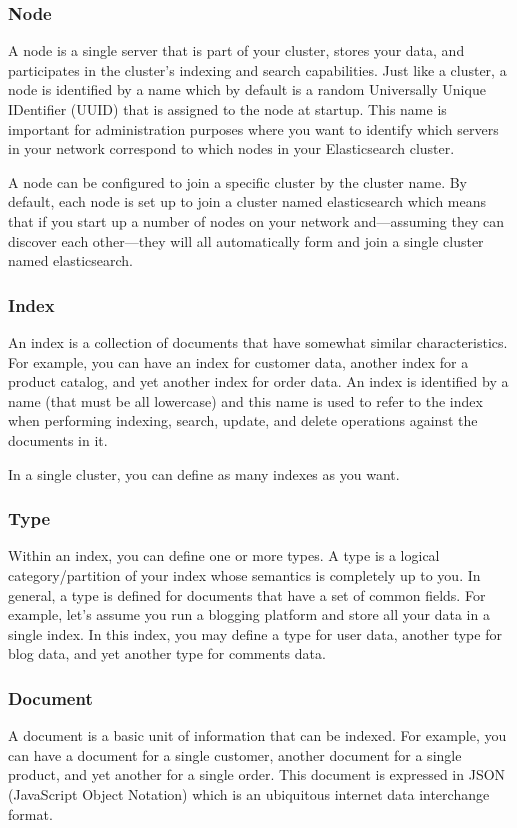 \documentclass[a4paper, 12pt]{book}
\begin{document}
\subsubsection{Node}
A node is a single server that is part of your cluster, stores your data, and participates in the cluster’s indexing and search capabilities. Just like a cluster, a node is identified by a name which by default is a random Universally Unique IDentifier (UUID) that is assigned to the node at startup. This name is important for administration purposes where you want to identify which servers in your network correspond to which nodes in your Elasticsearch cluster.

A node can be configured to join a specific cluster by the cluster name. By default, each node is set up to join a cluster named elasticsearch which means that if you start up a number of nodes on your network and—assuming they can discover each other—they will all automatically form and join a single cluster named elasticsearch.

\subsubsection{Index}
An index is a collection of documents that have somewhat similar characteristics. For example, you can have an index for customer data, another index for a product catalog, and yet another index for order data. An index is identified by a name (that must be all lowercase) and this name is used to refer to the index when performing indexing, search, update, and delete operations against the documents in it.

In a single cluster, you can define as many indexes as you want.

\subsubsection{Type}
Within an index, you can define one or more types. A type is a logical category/partition of your index whose semantics is completely up to you. In general, a type is defined for documents that have a set of common fields. For example, let’s assume you run a blogging platform and store all your data in a single index. In this index, you may define a type for user data, another type for blog data, and yet another type for comments data.

\subsubsection{Document}
A document is a basic unit of information that can be indexed. For example, you can have a document for a single customer, another document for a single product, and yet another for a single order. This document is expressed in JSON (JavaScript Object Notation) which is an ubiquitous internet data interchange format.
\end{document}
